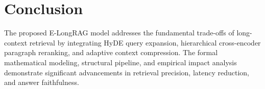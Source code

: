 \documentclass[11pt,a4paper]{article}
\begin{document}
\section{Conclusion}
The proposed E-LongRAG model addresses the fundamental trade-offs of long-context retrieval by integrating HyDE query expansion, hierarchical cross-encoder paragraph reranking, and adaptive context compression. The formal mathematical modeling, structural pipeline, and empirical impact analysis demonstrate significant advancements in retrieval precision, latency reduction, and answer faithfulness.
\end{document}
